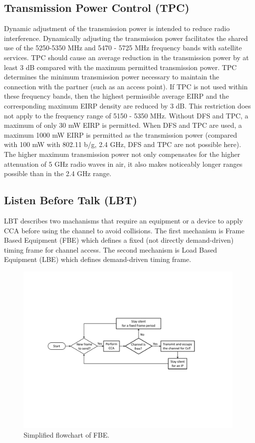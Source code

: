 \subsection{Transmission Power Control (TPC)}
Dynamic adjustment of the transmission power is intended to reduce radio interference. Dynamically adjusting the transmission power facilitates the shared use of the 5250-5350 MHz and 5470 - 5725 MHz frequency bands with satellite services. TPC should cause an average reduction in the transmission power by at least 3 dB compared with the maximum permitted transmission power. TPC determines the minimum transmission power necessary to maintain the connection with the partner (such as an access point). If TPC is not used within these frequency bands, then the highest permissible average EIRP and the corresponding maximum EIRP density are reduced by 3 dB. This restriction does not apply to the frequency range of 5150 - 5350 MHz. Without DFS and TPC, a maximum of only 30 mW EIRP is permitted. When DFS and TPC are used, a maximum 1000 mW EIRP is permitted as the transmission power (compared with 100 mW with 802.11 b/g, 2.4 GHz, DFS and TPC are not possible here). The higher maximum transmission
power not only compensates for the higher attenuation of 5 GHz radio waves in air, it also makes noticeably longer ranges possible than in the 2.4 GHz range. 

\subsection{Listen Before Talk (LBT)}

LBT describes two machanisms that require an equipment or a device to apply CCA before using the channel to avoid collisions. The first mechanism is Frame Based Equipment (FBE) which defines a fixed (not directly demand-driven) timing frame for channel access. The second mechanism is Load Based Equipment (LBE) which defines demand-driven timing frame.

\begin{figure}[!t]
	\centering
	\includegraphics[width=0.9\columnwidth]{figures2/FBE-flowchart}
	\caption{Simplified flowchart of FBE.}
	\label{figs:FBE-flowchart}
\end{figure}


